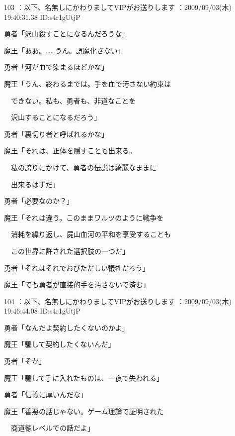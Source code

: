 \documentclass[a4j,twocolumn]{tarticle}
\begin{document}
	 

	

103 ：以下、名無しにかわりましてVIPがお送りします ：2009/09/03(木) 19:40:31.38 ID:s4r1gUtjP 


勇者「沢山殺すことになるんだろうな」 



魔王「ああ。……うん。誤魔化さない」 



勇者「河が血で染まるほどかな」 



魔王「うん、終わるまでは。手を血で汚さない約束は\par{} 
　できない。私も、勇者も、非道なことを\par{} 
　沢山することになるだろう」 



勇者「裏切り者と呼ばれるかな」\par{} 
魔王「それは、正体を隠すことも出来る。\par{} 
　私の誇りにかけて、勇者の伝説は綺麗なままに\par{} 
　出来るはずだ」 



勇者「必要なのか？」\par{} 
魔王「それは違う。このままワルツのように戦争を\par{} 
　消耗を繰り返し、屍山血河の平和を享受することも\par{} 
　この世界に許された選択肢の一つだ」 



勇者「それはそれでおびただしい犠牲だろう」\par{} 
魔王「でも勇者が直接的手を汚さないで済む」 

	
    
    

104 ：以下、名無しにかわりましてVIPがお送りします ：2009/09/03(木) 19:46:44.08 ID:s4r1gUtjP


勇者「なんだよ契約したくないのかよ」\par{} 
魔王「騙して契約したくないんだ」 



勇者「そか」\par{} 
魔王「騙して手に入れたものは、一夜で失われる」\par{} 
勇者「信義に厚いんだな」 



魔王「善悪の話じゃない。ゲーム理論で証明された\par{} 
　商道徳レベルでの話だよ」 
\end{document}
